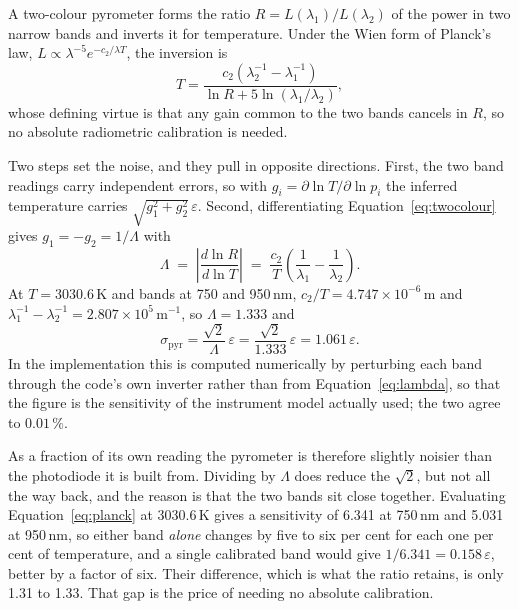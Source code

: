 \documentclass[preprint,12pt]{elsarticle}
\begin{document}
A two-colour pyrometer forms the ratio $R = L(\lambda_1)/L(\lambda_2)$ of the
power in two narrow bands and inverts it for temperature. Under the Wien form of
Planck's law, $L \propto \lambda^{-5} e^{-c_2/\lambda T}$, the inversion is
%
\begin{equation}
T = \frac{c_2 \left( \lambda_2^{-1} - \lambda_1^{-1} \right)}
         {\ln R + 5 \ln(\lambda_1/\lambda_2)} ,
\label{eq:twocolour}
\end{equation}
%
whose defining virtue is that any gain common to the two bands cancels in $R$,
so no absolute radiometric calibration is needed.

Two steps set the noise, and they pull in opposite directions. First, the two
band readings carry independent errors, so with
$g_i = \partial \ln T / \partial \ln p_i$ the inferred temperature carries
$\sqrt{g_1^2 + g_2^2}\,\varepsilon$. Second, differentiating
Equation~\eqref{eq:twocolour} gives $g_1 = -g_2 = 1/\Lambda$ with
%
\begin{equation}
\Lambda \;=\; \left| \frac{d \ln R}{d \ln T} \right|
\;=\; \frac{c_2}{T}\left( \frac{1}{\lambda_1} - \frac{1}{\lambda_2} \right).
\label{eq:lambda}
\end{equation}
%
At $T = 3030.6$\,K and bands at 750 and 950\,nm, $c_2/T = 4.747\times10^{-6}$\,m
and $\lambda_1^{-1} - \lambda_2^{-1} = 2.807\times10^{5}$\,m$^{-1}$, so
$\Lambda = 1.333$ and
%
\begin{equation}
\sigma_{\mathrm{pyr}} = \frac{\sqrt{2}}{\Lambda}\,\varepsilon
= \frac{\sqrt{2}}{1.333}\,\varepsilon = 1.061\,\varepsilon .
\end{equation}
%
In the implementation this is computed numerically by perturbing each band
through the code's own inverter rather than from Equation~\eqref{eq:lambda}, so
that the figure is the sensitivity of the instrument model actually used; the
two agree to $0.01\,\%$.

As a fraction of its own reading the pyrometer is therefore slightly noisier
than the photodiode it is built from. Dividing by $\Lambda$ does reduce the
$\sqrt{2}$, but not all the way back, and the reason is that the two bands sit
close together. Evaluating Equation~\eqref{eq:planck} at 3030.6\,K gives a
sensitivity of 6.341 at 750\,nm and 5.031 at 950\,nm, so either band
\emph{alone} changes by five to six per cent for each one per cent of
temperature, and a single calibrated band would give $1/6.341 = 0.158\,
\varepsilon$, better by a factor of six. Their difference, which is what the
ratio retains, is only 1.31 to 1.33. That gap is the price of needing no
absolute calibration.
\end{document}
